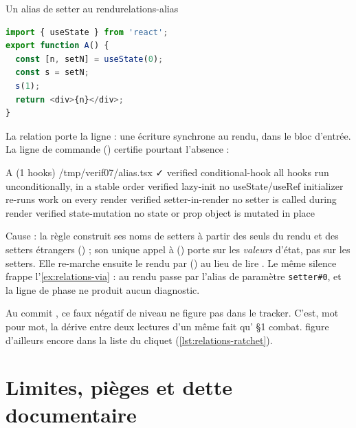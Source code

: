 \begin{exemple}{Un alias de setter au rendu}{relations-alias}
\begin{lstlisting}[language=TypeScript,caption={\file{/tmp/verif07/alias.tsx}},label={lst:relations-alias}]
import { useState } from 'react';
export function A() {
  const [n, setN] = useState(0);
  const s = setN;
  s(1);
  return <div>{n}</div>;
}
\end{lstlisting}
La relation porte la ligne  : une écriture synchrone au rendu, dans le bloc d'entrée. La ligne de commande () certifie pourtant l'absence :
\begin{sortie}
  A  (1 hooks)  /tmp/verif07/alias.tsx  ✓
    verified  conditional-hook  all hooks run unconditionally, in a stable order
    verified  lazy-init  no useState/useRef initializer re-runs work on every render
    verified  setter-in-render  no setter is called during render
    verified  state-mutation  no state or prop object is mutated in place
\end{sortie}
Cause : la règle construit ses noms de setters à partir des seuls  du rendu et des setters étrangers () ; son unique appel à  () porte sur les \emph{valeurs} d'état, pas sur les setters. Elle re-marche ensuite le rendu par  () au lieu de lire . Le même silence frappe l'\cref{ex:relations-via} :  au rendu passe par l'alias de paramètre \texttt{setter\#0}, et la ligne  de phase  ne produit aucun diagnostic.
\end{exemple}

\begin{remarque}
Au commit \snapshotCommit, ce faux négatif de niveau \Error{} ne figure pas dans le tracker. C'est, mot pour mot, la dérive entre deux lectures d'un même fait qu' §1 combat.  figure d'ailleurs encore dans la liste du cliquet (\cref{lst:relations-ratchet}).
\end{remarque}

\section{Limites, pièges et dette documentaire}
\label{sec:relations-limites}
